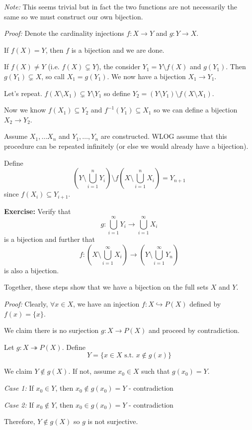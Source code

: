 \documentclass[12pt]{report}
\newcommand{\sub}{\subseteq}
\newcommand{\st}{\text{ s.t. }}
\newcommand{\card}{\text{card }}
\newcommand{\inj}{\hookrightarrow}
\newenvironment*{tbox}[2][gray]{
    \begin{tcolorbox}[
        parbox=false,
        colback=#1!5!white,
        colframe=#1!75!black,
        breakable,
        title={#2}
    ]}
    {\end{tcolorbox}}
\newenvironment*{exercise}[1][red]{
    \begin{tcolorbox}[
        parbox=false,
        colback=#1!5!white,
        colframe=#1!75!black,
        breakable
    ]}
    {\end{tcolorbox}}
\begin{document}
    \begin{tbox}{\textbf{Schröder-Bernstein Theorem:} If $\card X \leq \card Y$ and $\card Y \leq \card X$, then $\card X = \card Y$}
        \emph{Note:} This seems trivial but in fact the two functions are not necessarily the same so we must construct our own bijection. 

        \emph{Proof:} Denote the cardinality injections $f: X \to Y$ and $g: Y \to X$.

        If $f(X) = Y$, then $f$ is a bijection and we are done.

        If $f(X) \neq Y$ (i.e. $f(X) \subsetneq Y$), the consider $Y_1 = Y \setminus f(X)$ and $g(Y_1)$. Then $g(Y_1) \subsetneq X$, so call $X_1 = g(Y_1)$. We now have a bijection $X_1 \to Y_1$. 

        Let's repeat. $f(X \setminus X_1) \subsetneq Y \setminus Y_1$ so define $Y_2 = (Y \setminus Y_1) \setminus f(X \setminus X_1)$.

        Now we know $f(X_1) \sub Y_2$ and $f^{-1}(Y_1) \sub X_1$ so we can define a bijection $X_2 \to Y_2$.

        Assume $X_1, \dots X_n$ and $Y_1, \dots, Y_n$ are constructed. WLOG assume that this procedure can be repeated infinitely (or else we would already have a bijection). 

        Define 
        \[\left(Y \setminus \bigcup_{i=1}^n Y_i\right) \setminus f\left(X \setminus \bigcup_{i=1}^n X_i\right) = Y_{n+1}\]
        since $f(X_i) \sub Y_{i+1}$. 

        \begin{exercise}
            \textbf{Exercise:} Verify that 
            \[g: \bigcup_{i=1}^{\infty} Y_i \to \bigcup_{i=1}^{\infty} X_i\]
            is a bijection and further that 
            \[f: \left(X \setminus \bigcup_{i=1}^{\infty} X_i\right) \to \left(Y \setminus \bigcup_{i=1}^{\infty} Y_n\right)\] 
            is also a bijection.
        \end{exercise} 

        Together, these steps show that we have a bijection on the full sets $X$ and $Y$.
    \end{tbox}

    \begin{tbox}{\textbf{Proposition}: For any set $X$, $\card X < \card P(X)$}
        \emph{Proof:} Clearly, $\forall x \in X$, we have an injection $f: X \inj P(X)$ defined by $f(x) = \{x\}$.

        We claim there is no surjection $g: X \to P(X)$ and proceed by contradiction. 

        Let $g: X \twoheadrightarrow P(X)$. Define 
        \[Y = \{x \in X \st x \notin g(x)\}\] 

        We claim $Y \notin g(X)$. If not, assume $x_0 \in X$ such that $g(x_0) = Y$. 

        \emph{Case 1:} If $x_0 \in Y$, then $x_0 \notin g(x_0) = Y$ - contradiction 

        \emph{Case 2:} If $x_0 \notin Y$, then $x_0 \in g(x_0) = Y$ - contradiction

        Therefore, $Y \notin g(X)$ so $g$ is not surjective.
    \end{tbox}
\end{document}
